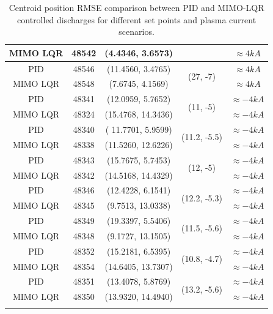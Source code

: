 \begin{center}
\begin{longtable}{||c| c| c| c|c||}
		\cline{1-3} \cline{5-5}
		MIMO LQR & 48542 & (4.4346,	3.6573) & &  $\approx 4 kA$ \\
		\hline
		PID & 48546 & (11.4560, 3.4765)  & \multirow{ 2}{*}{(27, -7)}&   $\approx 4 kA$\\ 
		\cline{1-3} \cline{5-5}
		MIMO LQR & 48548 & (7.6745, 4.1569) & &  $\approx 4 kA$ \\
		\hline
		PID & 48341 & (12.0959,	5.7652)  & \multirow{ 2}{*}{(11, -5)}& $\approx -4 kA$\\ 
		\cline{1-3} \cline{5-5}
		MIMO LQR & 48324 &  (15.4768,	14.3436)& & $\approx -4 kA$ \\
		\hline
		PID & 48340 & ( 11.7701, 5.9599) & \multirow{ 2}{*}{(11.2, -5.5)}&  $\approx -4 kA$\\ 
		\cline{1-3} \cline{5-5}
		MIMO LQR & 48338 & (11.5260,	12.6226) &  &  $\approx -4 kA$\\
		\hline
		PID & 48343 &(15.7675,	5.7453)   & \multirow{ 2}{*}{(12, -5)}&  $\approx -4 kA$  \\ 
		\cline{1-3} \cline{5-5}
		MIMO LQR & 48342 & (14.5168,	14.4329) & &  $\approx -4 kA$  \\
		\hline
		PID & 48346 & (12.4228,	6.1541)  & \multirow{ 2}{*}{(12.2, -5.3)}& $\approx -4 kA$\\ 
		\cline{1-3} \cline{5-5}
		MIMO LQR & 48345 & (9.7513,	13.0338) & & $\approx -4 kA$ \\
		\hline
		PID & 48349 & (19.3397,	5.5406)  & \multirow{ 2}{*}{(11.5, -5.6)}&$\approx -4 kA$  \\ 
		\cline{1-3} \cline{5-5}
		MIMO LQR & 48348 & (9.1727,	13.1505) & &$\approx -4 kA$  \\
		\hline
		PID & 48352 &  (15.2181,	6.5395) & \multirow{ 2}{*}{(10.8, -4.7)} &$\approx -4 kA$ \\ 
		\cline{1-3} \cline{5-5}
		MIMO LQR & 48354 & (14.6405,	13.7307) & & $\approx -4 kA$ \\
		\hline
		PID & 48351 &  (13.4078, 5.8769) & \multirow{ 2}{*}{(13.2, -5.6)}& $\approx -4 kA$ \\ 
		\cline{1-3} \cline{5-5} 
		MIMO LQR & 48350 & (13.9320,	14.4940) & &$\approx -4 kA$  \\
		\hline 
		\caption{Centroid position RMSE comparison between PID and MIMO-LQR controlled discharges for different set points and plasma current scenarios.}
	\end{longtable}
	\label{TableControl}
	
\end{center}

